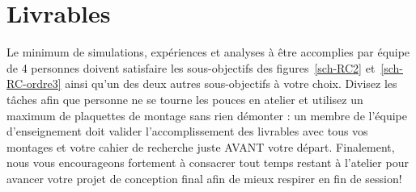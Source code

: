 \documentclass[canadien,12pt,oneside,letterpaper]{article}
\begin{document}
\vspace{-2ex}
\section{Livrables}\label{sec:livrables}
\vspace{-3ex}
Le minimum de simulations, expériences et analyses à être accomplies par équipe de 4 personnes doivent satisfaire les sous-objectifs des figures~\ref{sch-RC2} et~\ref{sch-RC-ordre3} ainsi qu'un des deux autres sous-objectifs à votre choix. Divisez les tâches afin que personne ne se tourne les pouces en atelier et utilisez un maximum de plaquettes de montage sans rien démonter : un membre de l'équipe d'enseignement doit valider l'accomplissement des livrables avec tous vos montages et votre cahier de recherche juste AVANT votre départ. Finalement, nous vous encourageons fortement à consacrer tout temps restant à l'atelier pour avancer votre projet de conception final afin de mieux respirer en fin de session!




\end{document}
